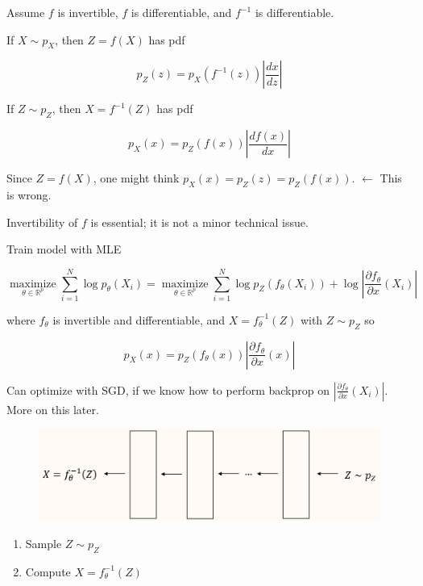 \documentclass{report}
\begin{document}
\begin{concept}
    Assume $f$ is invertible, $f$ is differentiable, and $f^{-1}$ is differentiable.

    If $X \sim p_{X}$, then $Z=f(X)$ has pdf

    $$
    p_{Z}(z)=p_{X}\left(f^{-1}(z)\right)\left|\frac{d x}{d z}\right|
    $$

    If $Z \sim p_{Z}$, then $X=f^{-1}(Z)$ has pdf

    $$
    p_{X}(x)=p_{Z}(f(x))\left|\frac{d f(x)}{d x}\right|
    $$

    Since $Z=f(X)$, one might think $p_{X}(x)=p_{Z}(z)=p_{Z}(f(x))$. $\leftarrow$ This is wrong.

    Invertibility of $f$ is essential; it is not a minor technical issue.
\end{concept}

\begin{definition}
    Train model with MLE

    $$
    \underset{\theta \in \mathbb{R}^{p}}{\operatorname{maximize}} \sum_{i=1}^{N} \log p_{\theta}\left(X_{i}\right)=\underset{\theta \in \mathbb{R}^{p}}{\operatorname{maximize}} \sum_{i=1}^{N} \log p_{Z}\left(f_{\theta}\left(X_{i}\right)\right)+\log \left|\frac{\partial f_{\theta}}{\partial x}\left(X_{i}\right)\right|
    $$

    where $f_{\theta}$ is invertible and differentiable, and $X=f_{\theta}^{-1}(Z)$ with $Z \sim p_{Z}$ so

    $$
    p_{X}(x)=p_{Z}\left(f_{\theta}(x)\right)\left|\frac{\partial f_{\theta}}{\partial x}(x)\right|
    $$

    Can optimize with SGD, if we know how to perform backprop on $\left|\frac{\partial f_{\theta}}{\partial x}\left(X_{i}\right)\right|$. More on this later.
\end{definition}

\begin{definition}
    \begin{figure}[H]
        \centering
        \includegraphics[width=1.0\textwidth]{.././assets/10.7.png}
    \end{figure}

    \begin{enumerate}
        \item Sample $Z \sim p_{Z}$
        \item Compute $X=f_{\theta}^{-1}(Z)$
    \end{enumerate}
\end{definition}
\end{document}
